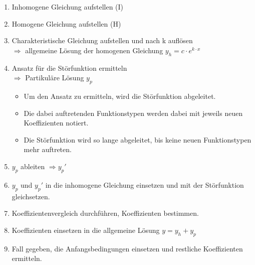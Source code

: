 \begin{enumerate}
	\item Inhomogene Gleichung aufstellen (I)
	\item Homogene Gleichung aufstellen (H)
	\item Charakteristische Gleichung aufstellen und nach k auflösen\\
		  $\Rightarrow$ allgemeine Lösung der homogenen Gleichung 
		  $y_h = c\cdot e^{k\cdot x}$
	\item Ansatz für die Störfunktion ermitteln \\
		  $\Rightarrow$ Partikuläre Lösung $y_p$ 
          \begin{itemize}
              \item Um den Ansatz zu ermitteln, wird die Störfunktion 
                    abgeleitet. 
              \item Die dabei auftretenden Funktionstypen werden dabei mit 
                    jeweils neuen Koeffizienten notiert. 
              \item Die Störfunktion wird so lange abgeleitet, bis keine neuen 
                    Funktionstypen mehr auftreten. 
          \end{itemize}
	\item $y_p$ ableiten $\Rightarrow y_p'$
	\item $y_p$ und $y_p'$ in die inhomogene Gleichung einsetzen
		  und mit der Störfunktion gleichsetzen.
	\item Koeffizientenvergleich durchführen, Koeffizienten bestimmen.
	\item Koeffizienten einsetzen in die allgemeine Lösung $y=y_h + y_p$
	\item Fall gegeben, die Anfangsbedingungen einsetzen und restliche 
		  Koeffizienten ermitteln.
\end{enumerate}

\scriptsize

\normalsize


\newpage
